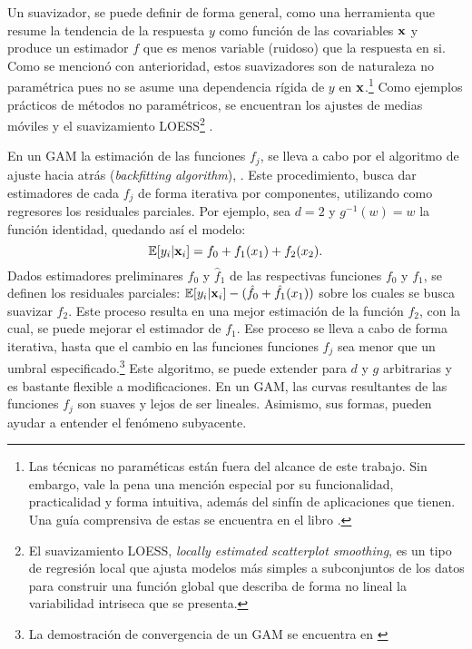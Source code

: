 \documentclass[../Main/Main.tex]{subfiles}
\begin{document}
Un suavizador, se puede definir de forma general, como una herramienta que resume la tendencia de la respuesta $y$ como función de las covariables $\mathbf{x}$ y produce un estimador $f$ que es menos variable (ruidoso) que la respuesta en si. Como se mencionó con anterioridad, estos suavizadores son de naturaleza no paramétrica pues no se asume una dependencia rígida de $y$ en $\mathbf{x}$.\footnote{Las técnicas no paraméticas están fuera del alcance de este trabajo. Sin embargo, vale la pena una mención especial por su funcionalidad, practicalidad y forma intuitiva, además del sinfín de aplicaciones que tienen. Una guía comprensiva de estas se encuentra en el libro \citet{wasserman2007all}.} Como ejemplos prácticos de métodos no paramétricos, se encuentran los ajustes de medias móviles y el suavizamiento LOESS\footnote{El suavizamiento LOESS, \textit{locally estimated scatterplot smoothing}, es un tipo de regresión local que ajusta modelos más simples a subconjuntos de los datos para construir una función global que describa de forma no lineal la variabilidad intriseca que se presenta.} \autocite{cleveland1988locally}. 

En un GAM la estimación de las funciones $f_j$, se lleva a cabo por el algoritmo de ajuste hacia atrás (\textit{backfitting algorithm}), \citet{hastie1986generalized}. Este procedimiento, busca dar estimadores de cada $f_j$ de forma iterativa por componentes, utilizando como regresores los residuales parciales. Por ejemplo, sea $d = 2$ y $g^{-1}(w) = w$ la función identidad, quedando así el modelo:
$$\mathbb{E}[y_i|\mathbf{x}_i] = f_0 + f_1(x_1) + f_2(x_2).$$
Dados estimadores preliminares $\hat{f}_0$ y $\hat{f}_1$ de las respectivas funciones $f_0$ y $f_1$, se definen los residuales parciales: $\mathbb{E}[y_i|\mathbf{x}_i] - (\hat{f}_0 + \hat{f}_1(x_1))$ sobre los cuales se busca suavizar $f_2$. Este proceso resulta en una mejor estimación de la función $f_2$, con la cual, se puede mejorar el estimador de $f_1$. Ese proceso se lleva a cabo de forma iterativa, hasta que el cambio en las funciones funciones $f_j$  sea menor que un umbral especificado.\footnote{La demostración de convergencia de un GAM se encuentra en \citet{stone1985additive}} Este algoritmo, se puede extender para $d$ y $g$ arbitrarias y es bastante flexible a modificaciones. En un GAM, las curvas resultantes de las funciones $f_j$ son suaves y lejos de ser lineales. Asimismo, sus formas, pueden ayudar a entender el fenómeno subyacente. 
\end{document}

